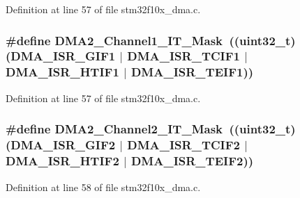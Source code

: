 Definition at line 57 of file stm32f10x\+\_\+dma.\+c.

\subsubsection[{\texorpdfstring{D\+M\+A2\+\_\+\+Channel1\+\_\+\+I\+T\+\_\+\+Mask}{DMA2_Channel1_IT_Mask}}]{\setlength{\rightskip}{0pt plus 5cm}\#define D\+M\+A2\+\_\+\+Channel1\+\_\+\+I\+T\+\_\+\+Mask~(({\bf uint32\+\_\+t})({\bf D\+M\+A\+\_\+\+I\+S\+R\+\_\+\+G\+I\+F1} $\vert$ {\bf D\+M\+A\+\_\+\+I\+S\+R\+\_\+\+T\+C\+I\+F1} $\vert$ {\bf D\+M\+A\+\_\+\+I\+S\+R\+\_\+\+H\+T\+I\+F1} $\vert$ {\bf D\+M\+A\+\_\+\+I\+S\+R\+\_\+\+T\+E\+I\+F1}))}\hypertarget{group___d_m_a___private___defines_ga1a8a861830805d87d8f487920525125d}{}\label{group___d_m_a___private___defines_ga1a8a861830805d87d8f487920525125d}


Definition at line 57 of file stm32f10x\+\_\+dma.\+c.

\subsubsection[{\texorpdfstring{D\+M\+A2\+\_\+\+Channel2\+\_\+\+I\+T\+\_\+\+Mask}{DMA2_Channel2_IT_Mask}}]{\setlength{\rightskip}{0pt plus 5cm}\#define D\+M\+A2\+\_\+\+Channel2\+\_\+\+I\+T\+\_\+\+Mask~(({\bf uint32\+\_\+t})({\bf D\+M\+A\+\_\+\+I\+S\+R\+\_\+\+G\+I\+F2} $\vert$ {\bf D\+M\+A\+\_\+\+I\+S\+R\+\_\+\+T\+C\+I\+F2} $\vert$ {\bf D\+M\+A\+\_\+\+I\+S\+R\+\_\+\+H\+T\+I\+F2} $\vert$ {\bf D\+M\+A\+\_\+\+I\+S\+R\+\_\+\+T\+E\+I\+F2}))}\hypertarget{group___d_m_a___private___defines_ga93ffc8595a8b0f1410b9e8a348fcd480}{}\label{group___d_m_a___private___defines_ga93ffc8595a8b0f1410b9e8a348fcd480}


Definition at line 58 of file stm32f10x\+\_\+dma.\+c.

